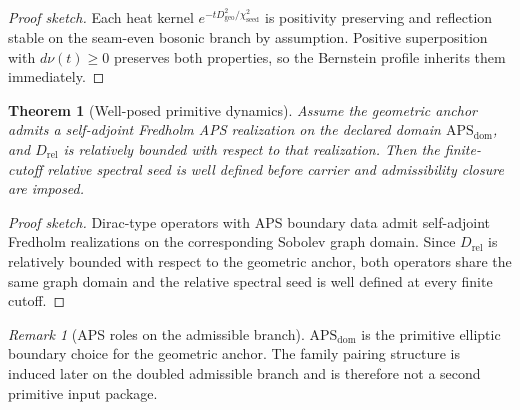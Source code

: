 \documentclass[11pt,a4paper]{article}
\newtheorem{theorem}{Theorem}[section]
\theoremstyle{definition}
\theoremstyle{remark}
\newtheorem*{remark}{Remark}
\newcommand{\chiseed}{\chi_{\mathrm{seed}}}
\newcommand{\APSdom}{\mathrm{APS}_{\mathrm{dom}}}
\begin{document}
\begin{proof}[Proof sketch]
Each heat kernel $e^{-tD_{\mathrm{geo}}^2/\chiseed^2}$ is positivity preserving and reflection
stable on the seam-even bosonic branch by assumption. Positive superposition with
$d\nu(t)\ge 0$ preserves both properties, so the Bernstein profile inherits them immediately.
\end{proof}

\begin{theorem}[Well-posed primitive dynamics]
Assume the geometric anchor admits a self-adjoint Fredholm APS realization on the declared
domain $\APSdom$, and $D_{\mathrm{rel}}$ is relatively bounded with respect to that realization.
Then the finite-cutoff relative spectral seed is well defined before carrier and admissibility
closure are imposed.
\end{theorem}

\begin{proof}[Proof sketch]
Dirac-type operators with APS boundary data admit self-adjoint Fredholm realizations on the
corresponding Sobolev graph domain. Since $D_{\mathrm{rel}}$ is relatively bounded with respect
to the geometric anchor, both operators share the same graph domain and the relative spectral
seed is well defined at every finite cutoff.
\end{proof}

\begin{remark}[APS roles on the admissible branch]
$\APSdom$ is the primitive elliptic boundary choice for the geometric anchor. The family
pairing structure is induced later on the doubled admissible branch and is therefore not a
second primitive input package.
\end{remark}
\end{document}
